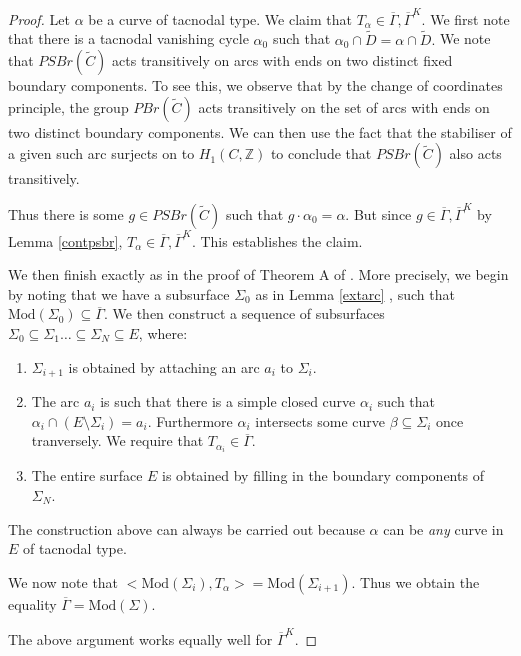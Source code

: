 \documentclass{article}
\newcommand{\ZZ}{ \mathbb{Z}}
\newcommand{\Mod}{\textrm{Mod}}
\begin{document}
\begin{proof}
    Let $\alpha$ be a curve of tacnodal type.  We claim that $T_{\alpha} \in \overline{\Gamma} , \overline{\Gamma}^K.$ We first note that there is a tacnodal vanishing cycle $\alpha_0$ such that $\alpha_0 \cap \tilde D = \alpha \cap \tilde D.$ We note that $PSBr(\tilde C)$ acts transitively on arcs with ends on two distinct fixed boundary components. To see this, we observe that by the change of coordinates principle, the group $PBr(\tilde C)$ acts transitively on the set of arcs with ends on two distinct boundary components. We can then use the fact that the stabiliser of a given such arc surjects on to $H_1(C, \ZZ)$ to conclude that $PSBr(\tilde C)$ also acts transitively.
    
    
    Thus there is some $g \in PSBr(\tilde C)$ such that $g \cdot \alpha_0 = \alpha.$ But since $ g \in \overline{\Gamma}, \overline{\Gamma}^K$ by Lemma \ref{contpsbr}, $T_{\alpha} \in\overline{\Gamma}, \overline{\Gamma}^K.$ This establishes the claim.
    
  We then finish exactly as in the proof of Theorem A of \cite{BS}. More precisely, we begin by noting that we have a subsurface $\Sigma_0$ as in Lemma \ref{extarc} , such that $\Mod(\Sigma_0) 
     \subseteq \overline{\Gamma}$. We then construct a sequence of subsurfaces $\Sigma_0 \subseteq \Sigma_1 \dots \subseteq \Sigma_N \subseteq E$, where:
     \begin{enumerate}
         \item $\Sigma_{i+1}$ is obtained by attaching an arc $a_i$ to $\Sigma_{i}.$
         \item The arc $a_i$ is such that there is a simple closed curve $\alpha_i$ such that $\alpha_i \cap (E \setminus \Sigma_i) = a_i.$ Furthermore $\alpha_i$ intersects some curve $\beta \subseteq \Sigma_i$ once tranversely. We require that $T_{\alpha_i} \in \overline{\Gamma}.$
         \item The entire surface $E$ is obtained by filling in the boundary components of   $\Sigma_N.$
     \end{enumerate}

     The construction above can always be carried out because $\alpha$ can be \emph{any} curve in $E$ of tacnodal type. 

     We now note that $<\Mod(\Sigma_i), T_{\alpha}> = \Mod(\Sigma_{i+1}).$ Thus we obtain the equality $\overline{\Gamma} = \Mod(\Sigma).$

     The above argument works equally well for $\overline{\Gamma}^K.$
\end{proof}
\end{document}

